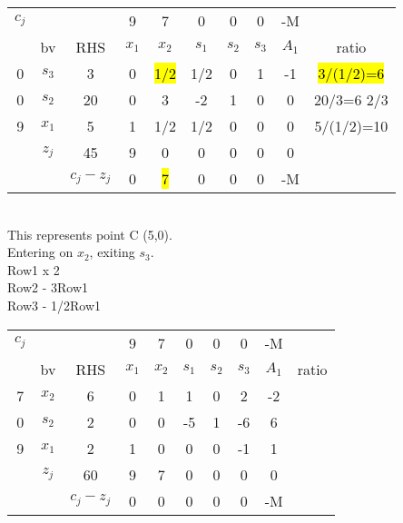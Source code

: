 \documentclass[answers]{exam}
\begin{document}
\begin{tabular}{cccccccccc}
	$c_j$                  &                            &                                & 9     & 7         & 0     & 0     & 0     & -M    &                 \\
	\multicolumn{1}{c|}{}  & \multicolumn{1}{c|}{bv}    & \multicolumn{1}{c|}{RHS}       & $x_1$ & $x_2$     & $s_1$ & $s_2$ & $s_3$ & $A_1$ & ratio           \\ \cline{1-9}
	\multicolumn{1}{c|}{0} & \multicolumn{1}{c|}{$s_3$} & \multicolumn{1}{c|}{3}         & 0     & \hl{1/2} & 1/2   & 0     & 1     & -1    & \hl{3/(1/2)=6} \\
	\multicolumn{1}{c|}{0} & \multicolumn{1}{c|}{$s_2$} & \multicolumn{1}{c|}{20}        & 0     & 3         & -2    & 1     & 0     & 0     & 20/3=6 2/3      \\
	\multicolumn{1}{c|}{9} & \multicolumn{1}{c|}{$x_1$} & \multicolumn{1}{c|}{5}         & 1     & 1/2       & 1/2   & 0     & 0     & 0     & 5/(1/2)=10      \\ \cline{1-9}
	& \multicolumn{1}{c|}{$z_j$} & \multicolumn{1}{c|}{45}        & 9     & 0         & 0     & 0     & 0     & 0     &                 \\ \cline{3-9}
	&                            & \multicolumn{1}{c|}{$c_j-z_j$} & 0     & \hl{7}   & 0     & 0     & 0     & -M    &                
\end{tabular} \\

\noindent
This represents point C (5,0). \\
Entering on $x_2$, exiting $s_3$. \\
Row1 x 2 \\
Row2 - 3Row1 \\
Row3 - 1/2Row1 \\

\begin{tabular}{cccccccccc}
	$c_j$                  &                            &                                & 9     & 7     & 0     & 0     & 0     & -M    &       \\
	\multicolumn{1}{c|}{}  & \multicolumn{1}{c|}{bv}    & \multicolumn{1}{c|}{RHS}       & $x_1$ & $x_2$ & $s_1$ & $s_2$ & $s_3$ & $A_1$ & ratio \\ \cline{1-9}
	\multicolumn{1}{c|}{7} & \multicolumn{1}{c|}{$x_2$} & \multicolumn{1}{c|}{6}         & 0     & 1     & 1     & 0     & 2     & -2    &       \\
	\multicolumn{1}{c|}{0} & \multicolumn{1}{c|}{$s_2$} & \multicolumn{1}{c|}{2}         & 0     & 0     & -5    & 1     & -6    & 6     &       \\
	\multicolumn{1}{c|}{9} & \multicolumn{1}{c|}{$x_1$} & \multicolumn{1}{c|}{2}         & 1     & 0     & 0     & 0     & -1    & 1     &       \\ \cline{1-9}
	& \multicolumn{1}{c|}{$z_j$} & \multicolumn{1}{c|}{60}        & 9     & 7     & 0     & 0     & 0     & 0     &       \\ \cline{3-9}
	&                            & \multicolumn{1}{c|}{$c_j-z_j$} & 0     & 0     & 0     & 0     & 0     & -M    &      
\end{tabular} \\
\end{document}
